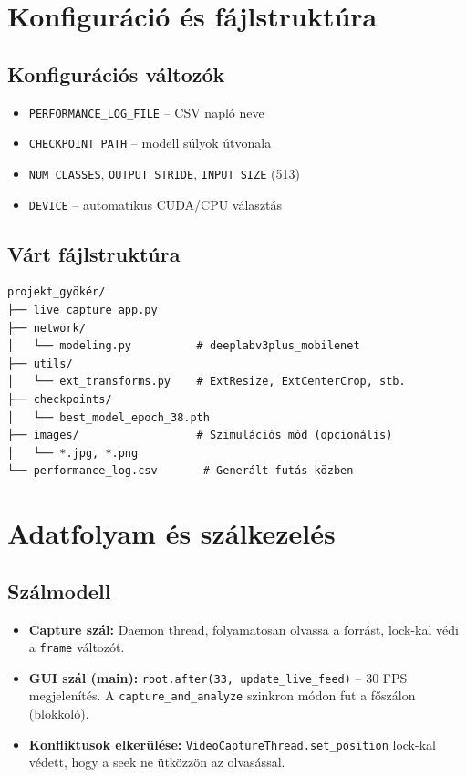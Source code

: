 \documentclass[12pt, a4paper]{report}
\begin{document}
\section{Konfiguráció és fájlstruktúra}

\subsection{Konfigurációs változók}
\begin{itemize}
    \item \texttt{PERFORMANCE\_LOG\_FILE} – CSV napló neve
    \item \texttt{CHECKPOINT\_PATH} – modell súlyok útvonala
    \item \texttt{NUM\_CLASSES}, \texttt{OUTPUT\_STRIDE}, \texttt{INPUT\_SIZE} (513)
    \item \texttt{DEVICE} – automatikus CUDA/CPU választás
\end{itemize}

\subsection{Várt fájlstruktúra}
\begin{verbatim}
projekt_gyökér/
├── live_capture_app.py
├── network/
│   └── modeling.py          # deeplabv3plus_mobilenet
├── utils/
│   └── ext_transforms.py    # ExtResize, ExtCenterCrop, stb.
├── checkpoints/
│   └── best_model_epoch_38.pth
├── images/                  # Szimulációs mód (opcionális)
│   └── *.jpg, *.png
└── performance_log.csv       # Generált futás közben
\end{verbatim}

\section{Adatfolyam és szálkezelés}

\subsection{Szálmodell}
\begin{itemize}
    \item \textbf{Capture szál:} Daemon thread, folyamatosan olvassa a forrást, lock-kal védi a \texttt{frame} változót.
    \item \textbf{GUI szál (main):} \texttt{root.after(33, update\_live\_feed)} – 30 FPS megjelenítés. A \texttt{capture\_and\_analyze} szinkron módon fut a főszálon (blokkoló).
    \item \textbf{Konfliktusok elkerülése:} \texttt{VideoCaptureThread.set\_position} lock-kal védett, hogy a seek ne ütközzön az olvasással.
\end{itemize}
\end{document}
